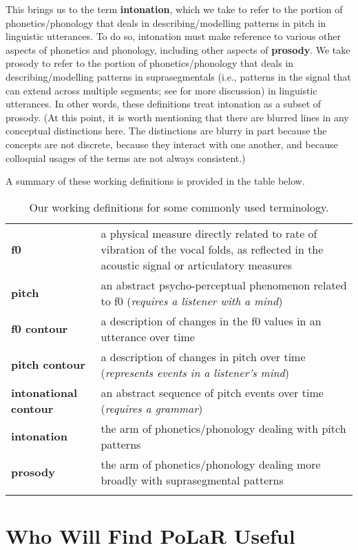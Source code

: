 This brings us to the term \textbf{intonation}, which we take to refer to the portion of phonetics\slash phonology that deals in describing\slash modelling patterns in pitch in linguistic utterances. To do so, intonation must make reference to various other aspects of phonetics and phonology, including other aspects of \textbf{prosody}. We take prosody to refer to the portion of phonetics\slash phonology that deals in describing\slash modelling patterns in suprasegmentals (i.e., patterns in the signal that can extend across multiple segments; see \citealt{lehiste70} for more discussion) in linguistic utterances. In other words, these definitions treat intonation as a subset of prosody. (At this point, it is worth mentioning that there are blurred lines in any conceptual distinctions here. The distinctions are blurry in part because the concepts are not discrete, because they interact with one another, and because colloquial usages of the terms are not always consistent.)

A summary of these working definitions is provided in the table below.

\begin{longtable}{>{\bfseries}p{.175\linewidth}p{.75\linewidth}} \endhead\toprule 
f0 &
a physical measure directly related to rate of vibration of the vocal folds, as reflected in the acoustic signal or articulatory measures
\tabularnewline\hdashline
pitch &
an abstract psycho-perceptual phenomenon related to f0 (\textit{requires a listener with a mind})
\tabularnewline\hdashline
f0 contour &
a description of changes in the f0 values in an utterance over time
\tabularnewline\hdashline
pitch contour &
a description of changes in pitch over time (\textit{represents events in a listener’s mind})
\tabularnewline\hdashline
intonational contour &
an abstract sequence of pitch events over time (\textit{requires a grammar})
\tabularnewline\hdashline
intonation &
the arm of phonetics\slash phonology dealing with pitch patterns
\tabularnewline\hdashline
prosody &
the arm of phonetics\slash phonology dealing more broadly with suprasegmental patterns
\tabularnewline\bottomrule 
\caption{Our working definitions for some commonly used terminology.
\label{tab:terminology}
}
\end{longtable}


\section{Who Will Find PoLaR Useful}\label{sec:who-will-find-polar-useful}

